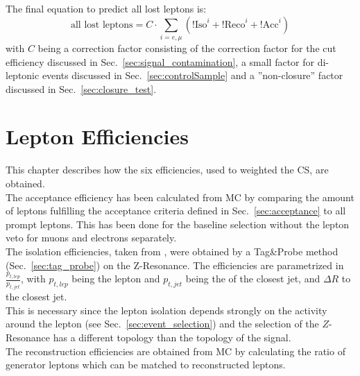 The final equation to predict all lost leptons is:
\begin{equation}
\label{eq:totalWeight}
 \text{all lost leptons} = C \cdot \sum_{i=e,\mu}\left(\text{!Iso}^i+\text{!Reco}^i+\text{!Acc}^i\right) 
\end{equation}
with $C$ being a correction factor consisting of the correction factor for the \mt cut efficiency discussed in Sec.~\ref{sec:signal_contamination}, a small factor for di-leptonic events discussed in Sec.~\ref{sec:controlSample} and a ''non-closure'' factor discussed in Sec.~\ref{sec:closure_test}.





\clearpage

\section{Lepton Efficiencies}
\label{sec:efficiencies}
This chapter describes how the six efficiencies, used to weighted the CS, are obtained.\\
The acceptance efficiency has been calculated from MC by comparing the amount of leptons fulfilling the acceptance criteria defined in Sec.~\ref{sec:acceptance} to all prompt leptons. This has been done for the baseline selection without the lepton veto for muons and electrons separately.\\
The isolation efficiencies, taken from \cite{bib:phd:jan}, were obtained by a Tag\&Probe method (Sec.~\ref{sec:tag_probe}) on the Z-Resonance. The efficiencies are parametrized in $\frac{p_{t,lep}}{p_{t,jet}}$, with $p_{t,lep}$ being the lepton and $p_{t,jet}$ being the \pt of the closest jet, and $\Delta R$ to the closest jet. \\
This is necessary since the lepton isolation depends strongly on the activity around the lepton (see Sec.~\ref{sec:event_selection}) and the selection of the $Z$-Resonance has a different topology than the topology of the signal.\\
The reconstruction efficiencies are obtained from MC by calculating the ratio of generator leptons which can be matched to reconstructed leptons.\\ %
